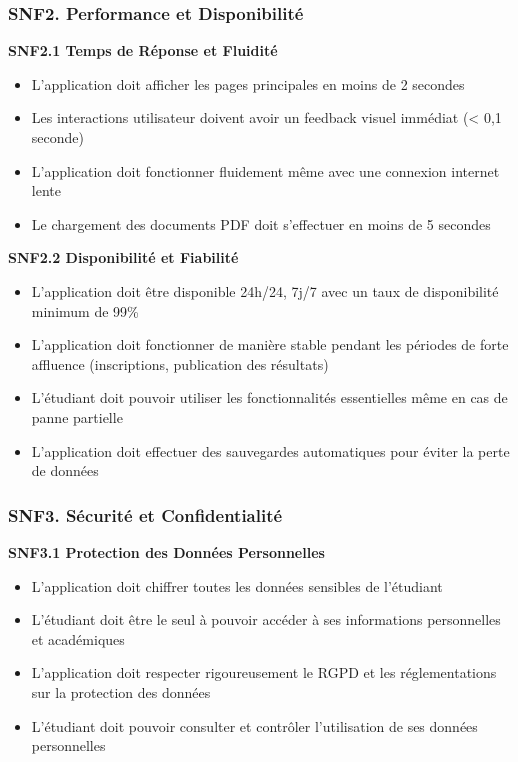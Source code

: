 \documentclass[12pt,a4paper]{report}
\begin{document}
\subsubsection{SNF2. Performance et Disponibilité}

\textbf{SNF2.1 Temps de Réponse et Fluidité}
\begin{itemize}
\item L'application doit afficher les pages principales en moins de 2 secondes
\item Les interactions utilisateur doivent avoir un feedback visuel immédiat (< 0,1 seconde)
\item L'application doit fonctionner fluidement même avec une connexion internet lente
\item Le chargement des documents PDF doit s'effectuer en moins de 5 secondes
\end{itemize}

\textbf{SNF2.2 Disponibilité et Fiabilité}
\begin{itemize}
\item L'application doit être disponible 24h/24, 7j/7 avec un taux de disponibilité minimum de 99\%
\item L'application doit fonctionner de manière stable pendant les périodes de forte affluence (inscriptions, publication des résultats)
\item L'étudiant doit pouvoir utiliser les fonctionnalités essentielles même en cas de panne partielle
\item L'application doit effectuer des sauvegardes automatiques pour éviter la perte de données
\end{itemize}

\subsubsection{SNF3. Sécurité et Confidentialité}

\textbf{SNF3.1 Protection des Données Personnelles}
\begin{itemize}
\item L'application doit chiffrer toutes les données sensibles de l'étudiant
\item L'étudiant doit être le seul à pouvoir accéder à ses informations personnelles et académiques
\item L'application doit respecter rigoureusement le RGPD et les réglementations sur la protection des données
\item L'étudiant doit pouvoir consulter et contrôler l'utilisation de ses données personnelles
\end{itemize}
\end{document}

